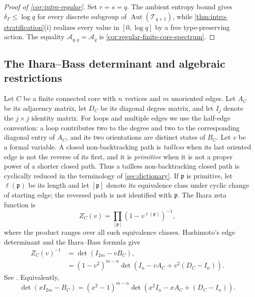 \documentclass[11pt]{amsart}
\theoremstyle{plain}
\theoremstyle{definition}
\theoremstyle{remark}
\newcommand{\T}{\mathcal T}
\newcommand{\Aut}{\operatorname{Aut}}
\newcommand{\cA}{\mathcal A}
\begin{document}
\begin{proof}[Proof of \cref{cor:intro-regular}]
Set \(r=s=q\).  The ambient entropy bound gives
\(\delta_\Gamma\leq\log q\) for every discrete subgroup of
\(\Aut(\T_{q+1})\), while \cref{thm:intro-stratification}\textup{(i)}
realizes every value in \([0,\log q]\) by a free type-preserving action.
The equality \(\cA_{q,q}=\cA_q\) is
\cref{cor:regular-finite-core-spectrum}.
\end{proof}

\subsection{The Ihara--Bass determinant and algebraic restrictions}
\label{sec:ihara}

Let \(C\) be a finite connected core with \(n\) vertices and \(m\) unoriented
edges.  Let \(A_C\) be its adjacency matrix, let \(D_C\) be its diagonal
degree matrix, and let \(I_j\) denote the \(j\times j\) identity matrix.
For loops and multiple edges we use the half-edge convention: a
loop contributes two to the degree and two to the corresponding diagonal
entry of \(A_C\), and its two orientations are distinct states of \(B_C\).
Let \(v\) be a formal variable.  A closed non-backtracking path is
\emph{tailless} when its last oriented edge is not the reverse of its first,
and it is \emph{primitive} when it is not a proper power of a shorter closed
path.  Thus a tailless non-backtracking closed path is cyclically reduced in
the terminology of \cref{sec:dictionary}.  If \(\mathfrak p\) is primitive,
let \(\ell(\mathfrak p)\) be its length and let \([\mathfrak p]\) denote its
equivalence class under cyclic change of starting edge; the reversed path is
not identified with \(\mathfrak p\).  The Ihara zeta function is
\[
  Z_C(v)=\prod_{[\mathfrak p]}(1-v^{\ell(\mathfrak p)})^{-1},
\]
where the product ranges over all such equivalence classes.
Hashimoto's edge determinant and the Ihara--Bass formula give
\begin{align}
  Z_C(v)^{-1}
  &=\det(I_{2m}-vB_C),\label{eq:hashimoto-det}\\
  &=(1-v^2)^{m-n}
     \det\!\left(I_n-vA_C+v^2(D_C-I_n)\right).
     \label{eq:ihara-bass}
\end{align}
See \cite{Hashimoto1989,Bass1992,KotaniSunada2000}.  Equivalently,
\begin{equation}\label{eq:char-bass}
  \det(xI_{2m}-B_C)
  =(x^2-1)^{m-n}
    \det\!\left(x^2I_n-xA_C+(D_C-I_n)\right).
\end{equation}
\end{document}
